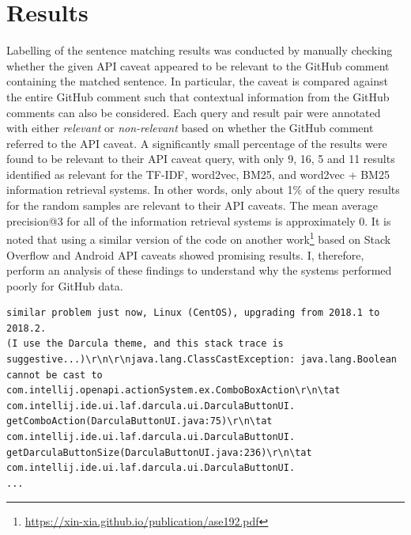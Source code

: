 \section{Results}
\label{sec:info-results}
Labelling of the sentence matching results was conducted by manually checking whether the given API caveat appeared to be relevant to the GitHub comment containing the matched sentence. In particular, the caveat is compared against the entire GitHub comment such that contextual information from the GitHub comments can also be considered. Each query and result pair were annotated with either \textit{relevant} or \textit{non-relevant} based on whether the GitHub comment referred to the API caveat. A significantly small percentage of the results were found to be relevant to their API caveat query, with only 9, 16, 5 and 11 results identified as relevant for the TF-IDF, word2vec, BM25, and word2vec + BM25 information retrieval systems. In other words, only about 1\% of the query results for the random samples are relevant to their API caveats. The mean average precision@3 for all of the information retrieval systems is approximately 0. It is noted that using a similar version of the code on another work\footnote{\url{https://xin-xia.github.io/publication/ase192.pdf}} based on Stack Overflow and Android API caveats showed promising results. I, therefore, perform an analysis of these findings to understand why the systems performed poorly for GitHub data.\\

\clearpage

\begin{lstlisting}[label=error-log,caption={Example of a GitHub comment containing an error log from \url{https://github.com/ChrisRM/material-theme-jetbrains/issues/863}},float,frame=tb,numbers=none,language=None]
similar problem just now, Linux (CentOS), upgrading from 2018.1 to 2018.2. 
(I use the Darcula theme, and this stack trace is suggestive...)\r\n\r\njava.lang.ClassCastException: java.lang.Boolean cannot be cast to com.intellij.openapi.actionSystem.ex.ComboBoxAction\r\n\tat com.intellij.ide.ui.laf.darcula.ui.DarculaButtonUI.
getComboAction(DarculaButtonUI.java:75)\r\n\tat com.intellij.ide.ui.laf.darcula.ui.DarculaButtonUI.
getDarculaButtonSize(DarculaButtonUI.java:236)\r\n\tat com.intellij.ide.ui.laf.darcula.ui.DarculaButtonUI.
...
\end{lstlisting}

